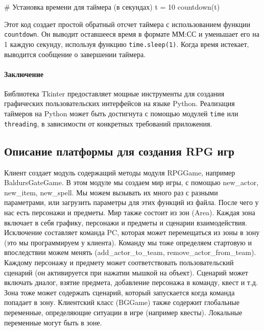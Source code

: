 	\# Установка времени для таймера (в секундах)
	t = 10
	countdown(t)
	
Этот код создает простой обратный отсчет таймера с использованием функции \texttt{countdown}. Он выводит оставшееся время в формате ММ:СС и уменьшает его на 1 каждую секунду, используя функцию \texttt{time.sleep(1)}. Когда время истекает, выводится сообщение о завершении таймера.
	
\paragraph{Заключение}
Библиотека Tkinter предоставляет мощные инструменты для создания графических пользовательских интерфейсов на языке Python. Реализация таймеров на Python может быть достигнута с помощью модулей \texttt{time} или \texttt{threading}, в зависимости от конкретных требований приложения.

\subsection{Описание платформы для создания RPG игр}
Клиент создает модуль содержащий методы модуля RPGGame, например BaldursGateGame. В этом модуле мы создаем мир игры, с помощью new\_actor, new\_item, new\_spell. Мы можем вызывать их много раз с разными параметрами, или загрузить параметры для этих функций из файла. После чего у нас есть персонажи и предметы. Мир также состоит из зон (Area). Каждая зона включает в себя графику, персонажи и предметы и сценарии взаимодействия. Исключение составляет команда PC, которая может перемещаться из зоны в зону (это мы программируем у клиента). Команду мы тоже определяем стартовую и впоследствии можем менять (add\_actor\_to\_team, remove\_actor\_from\_team). Каждому персонажу и предмету может соответствовать пользовательский сценарий (он активируется при нажатии мышкой на объект). Сценарий может включать диалог, взятие предмета, добавление персонажа в команду, квест и т.д.
Зона тоже может содержать сценарий, который запускается когда команда попадает в зону.
Клиентский класс (BGGame) также содержит глобальные переменные, определяющие ситуации в игре (например квесты). Локальные переменные могут быть в зоне.

